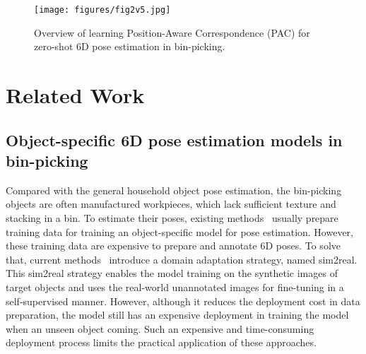 
\begin{figure*}[!t]
    \centering
    \texttt{[image: figures/fig2v5.jpg]}
    \caption{Overview of learning Position-Aware Correspondence (PAC) for zero-shot 6D pose estimation in bin-picking. }
    \label{fig:overall_framwork}
    \vspace{-2mm}
\end{figure*}

\vspace{-1mm}
\section{Related Work}
\label{sec:related work}
\subsection{Object-specific 6D pose estimation models in bin-picking}
Compared with the general household object pose estimation, the bin-picking objects are often manufactured workpieces, which lack sufficient texture and stacking in a bin.
To estimate their poses, existing methods~\cite{kleeberger2020single, aae,dcnet,mpaae,miretr, MVBPICRA, uni6dv2, chen2023geo6d, pprnet} usually prepare training data for training an object-specific model for pose estimation.
However, these training data are expensive to prepare and annotate 6D poses.
To solve that, current methods~\cite{st6deccv, ST6DICRA} introduce a domain adaptation strategy, named sim2real. This sim2real strategy enables the model training on the synthetic images of target objects and uses the real-world unannotated images for fine-tuning in a self-supervised manner. However, although it reduces the deployment cost in data preparation, the model still has an expensive deployment in training the model when an unseen object coming.
Such an expensive and time-consuming deployment process limits the practical application of these approaches.
